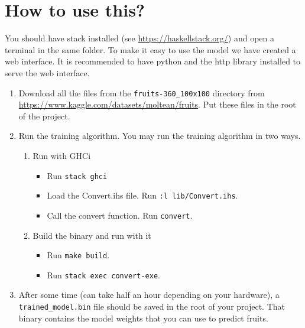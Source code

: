 \section{How to use this?}

You should have stack installed (see \url{https://haskellstack.org/}) and open a terminal in the same folder.
To make it easy to use the model we have created a web interface. It is recommended to have python and the http library installed to serve the web interface.

\begin{enumerate}
  \item Download all the files from the \texttt{fruits-360\_100x100} directory from \url{https://www.kaggle.com/datasets/moltean/fruits}. Put these files in the root of the project.
  \item Run the training algorithm. You may run the training algorithm in two ways. 
  \begin{enumerate}
      \item Run with GHCi
        \begin{itemize}
          \item Run \verb|stack ghci| 
          \item Load the Convert.ihs file. Run \verb|:l lib/Convert.ihs|. 
          \item Call the convert function. Run \verb|convert|.
        \end{itemize}
      \item Build the binary and run with it
        \begin{itemize}
            \item Run \verb|make build|.
            \item Run \verb|stack exec convert-exe|.
        \end{itemize}
  \end{enumerate}
  \item After some time (can take half an hour depending on your hardware), a \texttt{trained\_model.bin} file should be saved in the root of your project. That binary contains the model weights that you can use to predict fruits.



\end{enumerate}
